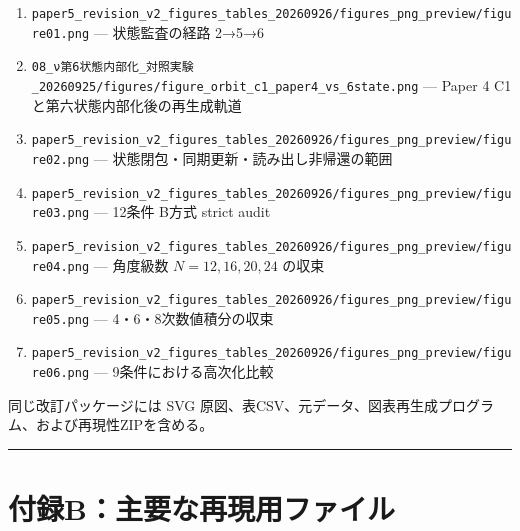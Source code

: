 \documentclass[
  a4paper,
]{ltjsarticle}
\providecommand{\tightlist}{%
  \setlength{\itemsep}{0pt}\setlength{\parskip}{0pt}}
\begin{document}
\begin{enumerate}
\def\labelenumi{\arabic{enumi}.}
\tightlist
\item
  \texttt{paper5\_\allowbreak{}revision\_\allowbreak{}v2\_\allowbreak{}figures\_\allowbreak{}tables\_\allowbreak{}20260926/\allowbreak{}figures\_\allowbreak{}png\_\allowbreak{}preview/\allowbreak{}figure01.png}
  --- 状態監査の経路 2→5→6
\item
  \texttt{08\_\allowbreak{}ν第6状態内部化\_\allowbreak{}対照実験\_\allowbreak{}20260925/\allowbreak{}figures/\allowbreak{}figure\_\allowbreak{}orbit\_\allowbreak{}c1\_\allowbreak{}paper4\_\allowbreak{}vs\_\allowbreak{}6state.png}
  --- Paper 4 C1 と第六状態内部化後の再生成軌道
\item
  \texttt{paper5\_\allowbreak{}revision\_\allowbreak{}v2\_\allowbreak{}figures\_\allowbreak{}tables\_\allowbreak{}20260926/\allowbreak{}figures\_\allowbreak{}png\_\allowbreak{}preview/\allowbreak{}figure02.png}
  --- 状態閉包・同期更新・読み出し非帰還の範囲
\item
  \texttt{paper5\_\allowbreak{}revision\_\allowbreak{}v2\_\allowbreak{}figures\_\allowbreak{}tables\_\allowbreak{}20260926/\allowbreak{}figures\_\allowbreak{}png\_\allowbreak{}preview/\allowbreak{}figure03.png}
  --- 12条件 B方式 strict audit
\item
  \texttt{paper5\_\allowbreak{}revision\_\allowbreak{}v2\_\allowbreak{}figures\_\allowbreak{}tables\_\allowbreak{}20260926/\allowbreak{}figures\_\allowbreak{}png\_\allowbreak{}preview/\allowbreak{}figure04.png}
  --- 角度級数 \(N=12,16,20,24\) の収束
\item
  \texttt{paper5\_\allowbreak{}revision\_\allowbreak{}v2\_\allowbreak{}figures\_\allowbreak{}tables\_\allowbreak{}20260926/\allowbreak{}figures\_\allowbreak{}png\_\allowbreak{}preview/\allowbreak{}figure05.png}
  --- 4・6・8次数値積分の収束
\item
  \texttt{paper5\_\allowbreak{}revision\_\allowbreak{}v2\_\allowbreak{}figures\_\allowbreak{}tables\_\allowbreak{}20260926/\allowbreak{}figures\_\allowbreak{}png\_\allowbreak{}preview/\allowbreak{}figure06.png}
  --- 9条件における高次化比較
\end{enumerate}

同じ改訂パッケージには SVG
原図、表CSV、元データ、図表再生成プログラム、および再現性ZIPを含める。

\begin{center}\rule{0.5\linewidth}{0.5pt}\end{center}

\section{付録B：主要な再現用ファイル}\label{ux4ed8ux9332bux4e3bux8981ux306aux518dux73feux7528ux30d5ux30a1ux30a4ux30eb}
\end{document}
